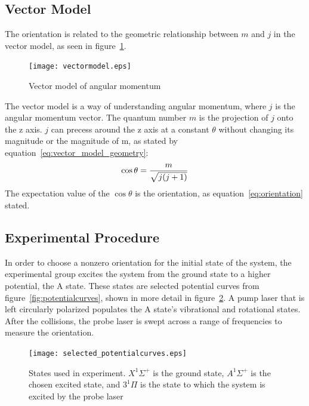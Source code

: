 \documentclass[letterpaper,titlepage,12pt]{article}
\begin{document}
\subsection{Vector Model}
The orientation is  related to the geometric relationship between \(m\) and \(j\) in
the vector model, as seen in figure~\ref{fig:vectormodel}.
\begin{figure}[h!]
    \centering
    \texttt{[image: vectormodel.eps]}
    \caption{Vector model of angular momentum}
\label{fig:vectormodel}
\end{figure}
\newline
The vector model is a way of understanding angular momentum,
where \(j\) is the angular momentum vector.  The quantum number \(m\) is the
projection of \(j\) onto the z axis.  \(j\) can precess around the z axis at a constant
\(\theta\) without changing its magnitude or the magnitude of m, as stated by
equation~\ref{eq:vector_model_geometry}:
\begin{equation}
    \cos\theta={{m}\over{\sqrt{j(j+1)}}}
    \label{eq:vector_model_geometry}
\end{equation}
The expectation value of the \(\cos\theta\) is the orientation, as
equation~\ref{eq:orientation} stated.

\newpage
\subsection{Experimental Procedure}
In order to choose a nonzero orientation for the initial state of the system,
the experimental group excites the system from the ground state to a higher
potential, the A state.  These states are selected potential curves from
figure~\ref{fig:potentialcurves}, shown in more detail in
figure~\ref{fig:selected_potcurves}.  A pump laser that is left circularly polarized
populates the A state's vibrational and rotational states.  After the collisions, the probe laser is swept
across a range of frequencies to measure the orientation.
\begin{figure}[h]
    \centering
    \texttt{[image: selected\_potentialcurves.eps]}
    \caption{States used in experiment. \(X^1\Sigma^+\) is the ground state,
    \(A^1\Sigma^+\) is the chosen excited state, and \(3^1\Pi\) is the state to
which the system is excited by the probe laser}
\label{fig:selected_potcurves}
\end{figure}
\end{document}
